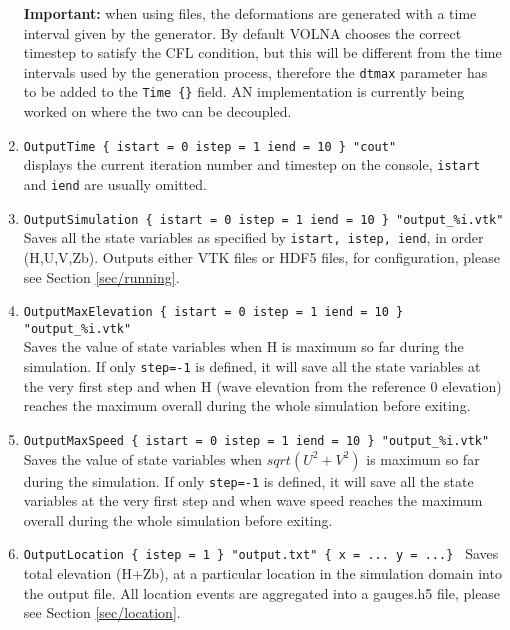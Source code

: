 \documentclass[11pt]{article}
\begin{document}
\begin{enumerate}
\textbf{Important:} when using files, the deformations are generated with a time interval given by the generator. By default VOLNA chooses the correct timestep to satisfy the CFL condition, but this will be different from the time intervals used by the generation process, therefore the \texttt{dtmax} parameter has to be added to the \texttt{Time \{\}} field. AN implementation is currently being worked on where the two can be decoupled.

\item \texttt{OutputTime \{ istart = 0 istep = 1 iend = 10 \} "cout"}\\
displays the current iteration number and timestep on the console, \texttt{istart} and \texttt{iend} are usually omitted.

\item \texttt{OutputSimulation \{ istart = 0 istep = 1 iend = 10 \} "output\_\%i.vtk" } \\
Saves all the state variables as specified by \texttt{istart, istep, iend}, in order (H,U,V,Zb). Outputs either VTK files or HDF5 files, for configuration, please see Section \ref{sec/running}.

\item \texttt{OutputMaxElevation \{ istart = 0 istep = 1 iend = 10 \} "output\_\%i.vtk" } \\
Saves the value of state variables when H is maximum so far during the simulation. If only \texttt{step=-1} is defined, it will save all the state variables at the very first step and when H (wave elevation from the reference 0 elevation) reaches the maximum overall during the whole simulation before exiting.

\item \texttt{OutputMaxSpeed \{ istart = 0 istep = 1 iend = 10 \} "output\_\%i.vtk" } \\
Saves the value of state variables when $sqrt(U^2+V^2)$ is maximum so far during the simulation. If only \texttt{step=-1} is defined, it will save all the state variables at the very first step and when wave speed reaches the maximum overall during the whole simulation before exiting.

\item \texttt{OutputLocation \{ istep = 1 \} "output.txt" \{ x = ... y = ...\} }
Saves total elevation (H+Zb), at a particular location in the simulation domain into the output file. All location events are aggregated into a gauges.h5 file, please see Section \ref{sec/location}.

\end{enumerate}
\end{document}
